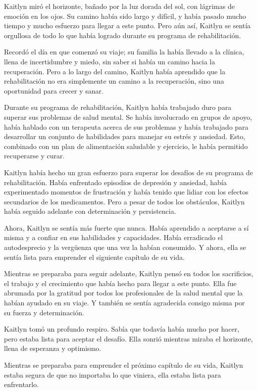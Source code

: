 
Kaitlyn miró el horizonte, bañado por la luz dorada del sol, con lágrimas de emoción en los ojos. Su camino había sido largo y difícil, y había pasado mucho tiempo y mucho esfuerzo para llegar a este punto. Pero aún así, Kaitlyn se sentía orgullosa de todo lo que había logrado durante su programa de rehabilitación.

Recordó el día en que comenzó su viaje; su familia la había llevado a la clínica, llena de incertidumbre y miedo, sin saber si había un camino hacia la recuperación. Pero a lo largo del camino, Kaitlyn había aprendido que la rehabilitación no era simplemente un camino a la recuperación, sino una oportunidad para crecer y sanar.

Durante su programa de rehabilitación, Kaitlyn había trabajado duro para superar sus problemas de salud mental. Se había involucrado en grupos de apoyo, había hablado con un terapeuta acerca de sus problemas y había trabajado para desarrollar un conjunto de habilidades para manejar su estrés y ansiedad. Esto, combinado con un plan de alimentación saludable y ejercicio, le había permitido recuperarse y curar.

Kaitlyn había hecho un gran esfuerzo para superar los desafíos de su programa de rehabilitación. Había enfrentado episodios de depresión y ansiedad, había experimentado momentos de frustración y había tenido que lidiar con los efectos secundarios de los medicamentos. Pero a pesar de todos los obstáculos, Kaitlyn había seguido adelante con determinación y persistencia.

Ahora, Kaitlyn se sentía más fuerte que nunca. Había aprendido a aceptarse a sí misma y a confiar en sus habilidades y capacidades. Había erradicado el autodesprecio y la vergüenza que una vez la habían consumido. Y ahora, ella se sentía lista para emprender el siguiente capítulo de su vida.

Mientras se preparaba para seguir adelante, Kaitlyn pensó en todos los sacrificios, el trabajo y el crecimiento que había hecho para llegar a este punto. Ella fue abrumada por la gratitud por todos los profesionales de la salud mental que la habían ayudado en su viaje. Y también se sentía agradecida consigo misma por su fuerza y determinación.

Kaitlyn tomó un profundo respiro. Sabía que todavía había mucho por hacer, pero estaba lista para aceptar el desafío. Ella sonrió mientras miraba el horizonte, llena de esperanza y optimismo.

Mientras se preparaba para emprender el próximo capítulo de su vida, Kaitlyn estaba segura de que no importaba lo que viniera, ella estaba lista para enfrentarlo.
